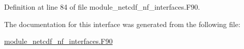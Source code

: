 Definition at line 84 of file module\+\_\+netcdf\+\_\+nf\+\_\+interfaces.\+F90.



The documentation for this interface was generated from the following file\+:\begin{DoxyCompactItemize}
\item 
\hyperlink{module__netcdf__nf__interfaces_8F90}{module\+\_\+netcdf\+\_\+nf\+\_\+interfaces.\+F90}\end{DoxyCompactItemize}
